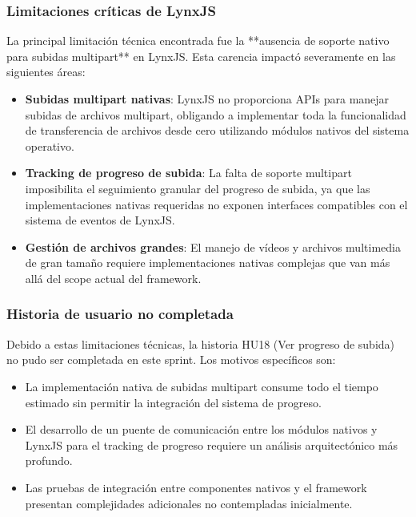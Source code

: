\subsubsection{Limitaciones críticas de LynxJS}

La principal limitación técnica encontrada fue la **ausencia de soporte nativo para subidas multipart** en LynxJS. Esta carencia impactó severamente en las siguientes áreas:

\begin{itemize}
    \item \textbf{Subidas multipart nativas}: LynxJS no proporciona APIs para manejar subidas de archivos multipart, obligando a implementar toda la funcionalidad de transferencia de archivos desde cero utilizando módulos nativos del sistema operativo.
    
    \item \textbf{Tracking de progreso de subida}: La falta de soporte multipart imposibilita el seguimiento granular del progreso de subida, ya que las implementaciones nativas requeridas no exponen interfaces compatibles con el sistema de eventos de LynxJS.
    
    \item \textbf{Gestión de archivos grandes}: El manejo de vídeos y archivos multimedia de gran tamaño requiere implementaciones nativas complejas que van más allá del scope actual del framework.
\end{itemize}

\subsubsection{Historia de usuario no completada}

Debido a estas limitaciones técnicas, la historia HU18 (Ver progreso de subida) no pudo ser completada en este sprint. Los motivos específicos son:

\begin{itemize}
    \item La implementación nativa de subidas multipart consume todo el tiempo estimado sin permitir la integración del sistema de progreso.
    \item El desarrollo de un puente de comunicación entre los módulos nativos y LynxJS para el tracking de progreso requiere un análisis arquitectónico más profundo.
    \item Las pruebas de integración entre componentes nativos y el framework presentan complejidades adicionales no contempladas inicialmente.
\end{itemize}

